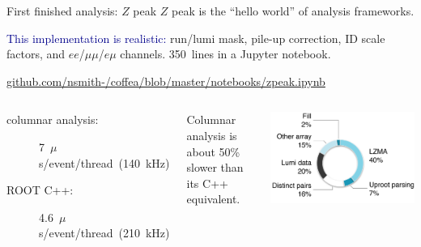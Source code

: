 \documentclass[aspectratio=169]{beamer}
\begin{document}
\begin{frame}{First finished analysis: $Z$ peak}
\vspace{0.5 cm}
$Z$ peak is the ``hello world'' of analysis frameworks.

\vspace{0.25 cm}
\textcolor{darkblue}{This implementation is realistic:} run/lumi mask, pile-up correction, ID scale factors, and $ee$/$\mu\mu$/$e\mu$ channels. 350~lines in a Jupyter notebook.

\vspace{0.5 cm}
\textcolor{blue}{\small \url{github.com/nsmith-/coffea/blob/master/notebooks/zpeak.ipynb}}

\vspace{0.5 cm}
\begin{columns}[b]
\large
\begin{description}
\item[columnar analysis:] \hfill \mbox{\hspace{-1 cm}7~$\mu$s/event/thread (140~kHz)}
\item[ROOT C++:] \hfill \mbox{\hspace{-1 cm}4.6~$\mu$s/event/thread (210~kHz)}
\end{description}

\vspace{0.25 cm}
Columnar analysis is about 50\% slower than its C++ equivalent.

\includegraphics[width=\linewidth]{zpeak-performance-breakdown.png}
\end{columns}
\end{frame}
\end{document}
